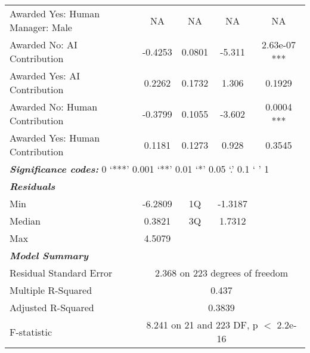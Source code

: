 \begin{table}[ht]
\begin{tabular}{lcccc}
        Awarded Yes: Human Manager: Male & NA  & NA  & NA  & NA  \\
        Awarded No: AI Contribution & -0.4253  & 0.0801  & -5.311  & 2.63e-07 ***  \\
        Awarded Yes: AI Contribution & 0.2262  & 0.1732  & 1.306  & 0.1929  \\
        Awarded No: Human Contribution & -0.3799  & 0.1055  & -3.602  & 0.0004 ***  \\
        Awarded Yes: Human Contribution & 0.1181  & 0.1273  & 0.928  & 0.3545  \\
        \midrule
        \multicolumn{5}{l}{\textbf{\textit{Significance codes:}} 0 ‘***’ 0.001 ‘**’ 0.01 ‘*’ 0.05 ‘.’ 0.1 ‘ ’ 1} \\
        \midrule
        \textbf{\textit{Residuals}} & \multicolumn{4}{c}{} \\
        Min & -6.2809 & 1Q & -1.3187 &  \\
        Median & 0.3821 & 3Q & 1.7312 &  \\
        Max & 4.5079 &  &  &  \\
        \midrule
        \textbf{\textit{Model Summary}}\\
        Residual Standard Error & \multicolumn{4}{c}{2.368 on 223 degrees of freedom} \\
        Multiple R-Squared & \multicolumn{4}{c}{0.437} \\
        Adjusted R-Squared & \multicolumn{4}{c}{0.3839} \\
        F-statistic & \multicolumn{4}{c}{8.241 on 21 and 223 DF, p $<$ 2.2e-16} \\
        \bottomrule
    \end{tabular}
    \label{tab:regression_competence_male}
\end{table}


